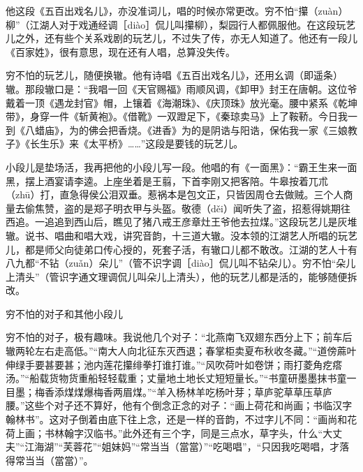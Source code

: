 \documentclass[12pt,UTF8]{ctexbook}
\begin{document}
他这段《五百出戏名儿》，亦没准词儿，唱的时候亦常更改。穷不怕“攥（zuàn）柳”（江湖人对于戏通经调［diào］侃儿叫攥柳），梨园行人都佩服他。在这段玩艺儿之外，还有些个关系戏剧的玩艺儿，不过失了传，亦无人知道了。他还有一段儿《百家姓》，很有意思，现在还有人唱，总算没失传。

穷不怕的玩艺儿，随便换辙。他有诗唱《五百出戏名儿》，还用幺调（即遥条）辙。那段辙口是：“我唱一回《天官赐福》雨顺风调，《卸甲》封王在唐朝。这位爷戴着一顶《遇龙封官》帽，上镶着《海潮珠》、《庆顶珠》放光毫。腰中紧系《乾坤带》，身穿一件《斩黄袍》。《借靴》一双蹬足下，《秦琼卖马》上了鞍鞒。今日我一到《八蜡庙》，为的佛会把香烧。《进香》为的是阴诰与阳诰，保佑我一家《三娘教子》《长生乐》来《太平桥》……”这段是要钱的玩艺儿。

小段儿是垫场活，我再把他的小段儿写一段。他唱的有《一面黑》：“霸王生来一面黑，摆上酒宴请李逵。上座坐着是王翦，下首李刚又把客陪。牛皋按着兀朮（zhū）打，直急得侯公泪双垂。惹祸本是包文正，只皆因周仓去做贼。三个人商量去偷焦赞，盗的是郑子明衣甲与头盔。敬德（děi）闻听失了盗，招惹得姚期往西追。一追追到西山后，瞧见了猪八戒王彦章灶王爷他去拉煤。”这段玩艺儿是灰堆辙。说书、唱曲和唱大戏，讲究音韵，十三道大辙。没本领的江湖艺人所唱的玩艺儿，都是师父向徒弟口传心授的，死套子活，有辙口儿都不敢改。江湖的艺人十有八九都“不钻（zuǎn）朵儿”（管不识字调［diào］侃儿叫不钻朵儿）。穷不怕“朵儿上清头”（管识字通文理调侃儿叫朵儿上清头），他的玩艺儿都是活的，能够随便拆改。





穷不怕的对子和其他小段儿


穷不怕的对子，极有趣味。我说他几个对子：“北燕南飞双翅东西分上下；前车后辙两轮左右走高低。”“南大人向北征东灭西退；春掌柜卖夏布秋收冬藏。”“道傍蔴叶伸绿手要甚要甚；池内莲花攥绯拳打谁打谁。”“风吹荷叶如卷饼；雨打菱角疙瘩汤。”“船载货物货重船轻轻载重；丈量地土地长丈短短量长。”“书童研墨墨抹书童一目墨；梅香添煤煤爆梅香两眉煤。”“羊入杨林羊吃杨叶芽；草庐驼草草压草庐腰。”这些个对子还不算好，他有个倒念正念的对子：“画上荷花和尚画；书临汉字翰林书”。这对子倒着由底下往上念，还是一样的音韵，不过字儿不同：“画尚和花荷上画；书林翰字汉临书。”此外还有三个字，同是三点水，草字头，什么“大丈夫”“江海湖”“芙蓉花”“姐妹妈”“常当当（當當）”“吃喝唱”，“只因我吃喝唱，才落得常当当（當當）”。
\end{document}
